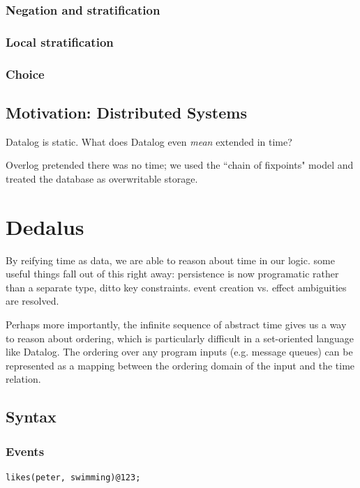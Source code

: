 \documentclass{acm_proc_article-sp-sigmod09}
\begin{document}
\subsubsection{Negation and stratification}

\subsubsection{Local stratification}

\subsubsection{Choice}

\subsection{Motivation: Distributed Systems}

Datalog is static.  What does Datalog even \emph{mean} extended in time?

Overlog pretended there was no time; we used the ``chain of fixpoints" model and treated the database as overwritable storage. 

\section{Dedalus}

By reifying time as data, we are able to reason about time in our logic.  some useful things fall out of this right away: persistence is now programatic rather than a separate type, ditto key constraints.  event creation vs. effect ambiguities are resolved.

Perhaps more importantly, the infinite sequence of abstract time gives us a way to reason about ordering, which is particularly difficult in a set-oriented language like Datalog.  The ordering over any program inputs (e.g. message queues) can be represented as a mapping between the ordering domain of the input and the time relation.

\subsection{Syntax}
\subsubsection{Events}
\begin{verbatim}
likes(peter, swimming)@123;
\end{verbatim}
\end{document}
